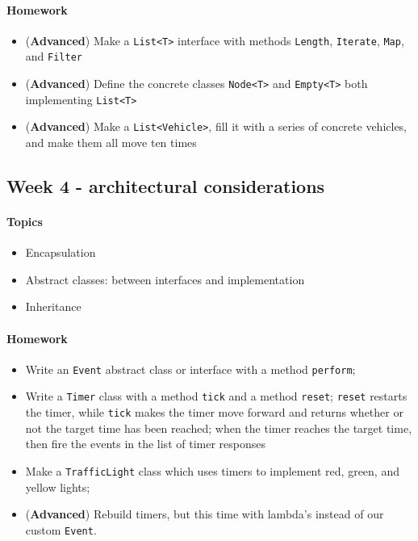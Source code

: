 \documentclass[12pt,a4paper,draft]{article}
\begin{document}
		\paragraph*{Homework}
		\begin{itemize}
			\item (\textbf{Advanced}) Make a \texttt{List<T>} interface with methods \texttt{Length}, \texttt{Iterate}, \texttt{Map}, and \texttt{Filter}
			\item (\textbf{Advanced}) Define the concrete classes \texttt{Node<T>} and \texttt{Empty<T>} both implementing \texttt{List<T>}
			\item (\textbf{Advanced}) Make a \texttt{List<Vehicle>}, fill it with a series of concrete vehicles, and make them all move ten times
		\end{itemize}
		
		
		
		\subsection{Week 4 - architectural considerations}
		
		\paragraph*{Topics}			
		\begin{itemize}
			\item Encapsulation
			\item Abstract classes: between interfaces and implementation
			\item Inheritance
		\end{itemize}
		
		\paragraph*{Homework}
		\begin{itemize}
			\item Write an \texttt{Event} abstract class or interface with a method \texttt{perform}; 
			\item Write a \texttt{Timer} class with a method \texttt{tick} and a method \texttt{reset}; \texttt{reset} restarts the timer, while \texttt{tick} makes the timer move forward and returns whether or not the target time has been reached; when the timer reaches the target time, then fire the events in the list of timer responses
			\item Make a \texttt{TrafficLight} class which uses timers to implement red, green, and yellow lights;
			\item (\textbf{Advanced}) Rebuild timers, but this time with lambda's instead of our custom \texttt{Event}.
		\end{itemize}
		
\end{document}

